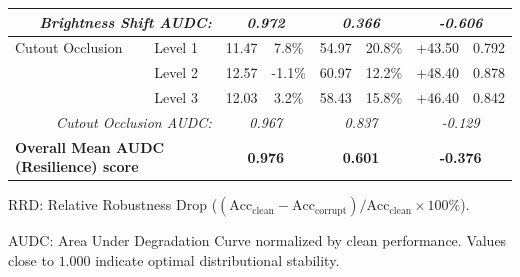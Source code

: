 \begin{table}[t]
\begin{tabular}{ll ccccc c}
\multicolumn{2}{r}{\textit{Brightness Shift AUDC:}} & \multicolumn{2}{c}{\textit{0.972}} & \multicolumn{2}{c}{\textit{0.366}} & \multicolumn{2}{c}{\textit{-0.606}} \\
\midrule
Cutout Occlusion & Level 1 & 11.47 & 7.8\% & 54.97 & 20.8\% & +43.50 & 0.792 \\
 & Level 2 & 12.57 & -1.1\% & 60.97 & 12.2\% & +48.40 & 0.878 \\
 & Level 3 & 12.03 & 3.2\% & 58.43 & 15.8\% & +46.40 & 0.842 \\
\multicolumn{2}{r}{\textit{Cutout Occlusion AUDC:}} & \multicolumn{2}{c}{\textit{0.967}} & \multicolumn{2}{c}{\textit{0.837}} & \multicolumn{2}{c}{\textit{-0.129}} \\
\midrule
\multicolumn{2}{l}{\textbf{Overall Mean AUDC (Resilience) score}} & \multicolumn{2}{c}{\textbf{0.976}} & \multicolumn{2}{c}{\textbf{0.601}} & \multicolumn{2}{c}{\textbf{-0.376}} \\
\bottomrule
\end{tabular}
\begin{tablenotes}
\footnotesize
\item RRD: Relative Robustness Drop ($(\text{Acc}_{\text{clean}} - \text{Acc}_{\text{corrupt}}) / \text{Acc}_{\text{clean}} \times 100\%$).
\item AUDC: Area Under Degradation Curve normalized by clean performance. Values close to $1.000$ indicate optimal distributional stability.
\end{tablenotes}
\end{table}